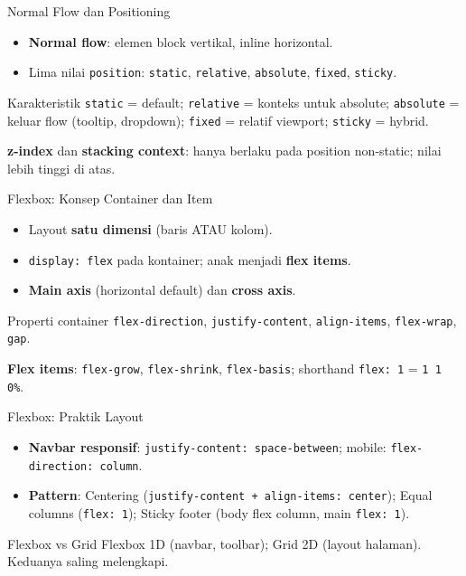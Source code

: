 \documentclass[handout]{beamer}
\begin{document}
\begin{frame}{Normal Flow dan Positioning}
	\begin{itemize}
		\item \textbf{Normal flow}: elemen block vertikal, inline horizontal.
		\item Lima nilai \texttt{position}: \texttt{static}, \texttt{relative}, \texttt{absolute}, \texttt{fixed}, \texttt{sticky}.
	\end{itemize}
	\begin{block}{Karakteristik}
		\texttt{static} = default; \texttt{relative} = konteks untuk absolute; \texttt{absolute} = keluar flow (tooltip, dropdown); \texttt{fixed} = relatif viewport; \texttt{sticky} = hybrid.
	\end{block}
	\textbf{z-index} dan \textbf{stacking context}: hanya berlaku pada position non-static; nilai lebih tinggi di atas.
\end{frame}

\begin{frame}{Flexbox: Konsep Container dan Item}
	\begin{itemize}
		\item Layout \textbf{satu dimensi} (baris ATAU kolom).
		\item \texttt{display: flex} pada kontainer; anak menjadi \textbf{flex items}.
		\item \textbf{Main axis} (horizontal default) dan \textbf{cross axis}.
	\end{itemize}
	\begin{block}{Properti container}
		\texttt{flex-direction}, \texttt{justify-content}, \texttt{align-items}, \texttt{flex-wrap}, \texttt{gap}.
	\end{block}
	\textbf{Flex items}: \texttt{flex-grow}, \texttt{flex-shrink}, \texttt{flex-basis}; shorthand \texttt{flex: 1} = \texttt{1 1 0\%}.
\end{frame}

\begin{frame}{Flexbox: Praktik Layout}
	\begin{itemize}
		\item \textbf{Navbar responsif}: \texttt{justify-content: space-between}; mobile: \texttt{flex-direction: column}.
		\item \textbf{Pattern}: Centering (\texttt{justify-content + align-items: center}); Equal columns (\texttt{flex: 1}); Sticky footer (body flex column, main \texttt{flex: 1}).
	\end{itemize}
	\begin{block}{Flexbox vs Grid}
		Flexbox 1D (navbar, toolbar); Grid 2D (layout halaman). Keduanya saling melengkapi.
	\end{block}
\end{frame}
\end{document}
